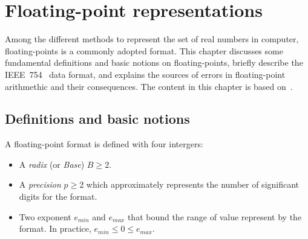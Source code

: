 \chapter{Floating-point representations}
\label{ch:background}
Among the different methods to represent the set of real numbers in computer,
floating-points is a commonly adopted format.
This chapter discusses some fundamental definitions and basic notions on
floating-points, briefly describe the IEEE~754~\cite{ieee754_2008-ev} data format, and 
explains the sources of errors in floating-point arithmethic and their consequences.
The content in this chapter is based on~\cite{Muller2018-zm}.

\section{Definitions and basic notions}
A floating-point format is defined with four intergers:
\begin{itemize}
	\item A \textit{radix} (or \textit{Base}) $B \ge 2$.
	\item A \textit{precision} $p \ge 2$ which approximately represents the number of significant digits for the format.
	\item Two exponent $e_{min}$ and $e_{max}$ that bound the range of value represent by the format. In practice, $e_{min} \le 0 \le e_{max}$.
\end{itemize}

